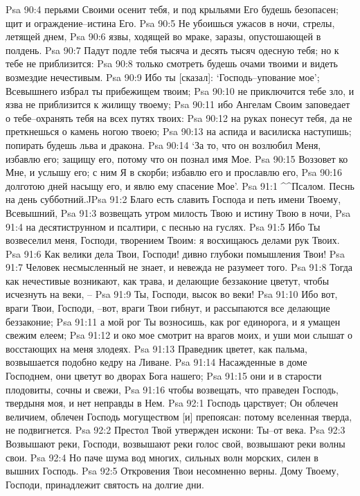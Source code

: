 Psa 90:4  перьями Своими осенит тебя, и под крыльями Его будешь безопасен; щит и ограждение--истина Его.
Psa 90:5  Не убоишься ужасов в ночи, стрелы, летящей днем,
Psa 90:6  язвы, ходящей во мраке, заразы, опустошающей в полдень.
Psa 90:7  Падут подле тебя тысяча и десять тысяч одесную тебя; но к тебе не приблизится:
Psa 90:8  только смотреть будешь очами твоими и видеть возмездие нечестивым.
Psa 90:9  Ибо ты [сказал]: `Господь--упование мое'; Всевышнего избрал ты прибежищем твоим;
Psa 90:10  не приключится тебе зло, и язва не приблизится к жилищу твоему;
Psa 90:11  ибо Ангелам Своим заповедает о тебе--охранять тебя на всех путях твоих:
Psa 90:12  на руках понесут тебя, да не преткнешься о камень ногою твоею;
Psa 90:13  на аспида и василиска наступишь; попирать будешь льва и дракона.
Psa 90:14  `За то, что он возлюбил Меня, избавлю его; защищу его, потому что он познал имя Мое.
Psa 90:15  Воззовет ко Мне, и услышу его; с ним Я в скорби; избавлю его и прославлю его,
Psa 90:16  долготою дней насыщу его, и явлю ему спасение Мое'.
Psa 91:1  ^^Псалом. Песнь на день субботний.^^
Psa 91:2  Благо есть славить Господа и петь имени Твоему, Всевышний,
Psa 91:3  возвещать утром милость Твою и истину Твою в ночи,
Psa 91:4  на десятиструнном и псалтири, с песнью на гуслях.
Psa 91:5  Ибо Ты возвеселил меня, Господи, творением Твоим: я восхищаюсь делами рук Твоих.
Psa 91:6  Как велики дела Твои, Господи! дивно глубоки помышления Твои!
Psa 91:7  Человек несмысленный не знает, и невежда не разумеет того.
Psa 91:8  Тогда как нечестивые возникают, как трава, и делающие беззаконие цветут, чтобы исчезнуть на веки, --
Psa 91:9  Ты, Господи, высок во веки!
Psa 91:10  Ибо вот, враги Твои, Господи, --вот, враги Твои гибнут, и рассыпаются все делающие беззаконие;
Psa 91:11  а мой рог Ты возносишь, как рог единорога, и я умащен свежим елеем;
Psa 91:12  и око мое смотрит на врагов моих, и уши мои слышат о восстающих на меня злодеях.
Psa 91:13  Праведник цветет, как пальма, возвышается подобно кедру на Ливане.
Psa 91:14  Насажденные в доме Господнем, они цветут во дворах Бога нашего;
Psa 91:15  они и в старости плодовиты, сочны и свежи,
Psa 91:16  чтобы возвещать, что праведен Господь, твердыня моя, и нет неправды в Нем.
Psa 92:1  Господь царствует; Он облечен величием, облечен Господь могуществом [и] препоясан: потому вселенная тверда, не подвигнется.
Psa 92:2  Престол Твой утвержден искони: Ты--от века.
Psa 92:3  Возвышают реки, Господи, возвышают реки голос свой, возвышают реки волны свои.
Psa 92:4  Но паче шума вод многих, сильных волн морских, силен в вышних Господь.
Psa 92:5  Откровения Твои несомненно верны. Дому Твоему, Господи, принадлежит святость на долгие дни.
